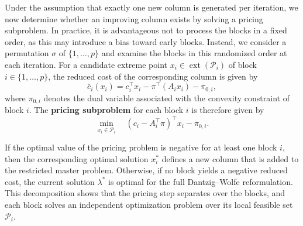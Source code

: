 \documentclass{book}
\theoremstyle{definition}
\numberwithin{algorithm_}{chapter}
\begin{document}
\bigskip

Under the assumption that exactly one new column is generated per iteration, we now determine whether an improving column exists by solving a pricing subproblem. In practice, it is advantageous not to process the blocks in a fixed order, as this may introduce a bias toward early blocks. Instead, we consider a permutation $\sigma$ of $\{1,\dots,p\}$ and examine the blocks in this randomized order at each iteration. For a candidate extreme point $x_i \in \operatorname{ext}(\mathcal{P}_i)$ of block $i \in \{1,\dots,p\}$, the reduced cost of the corresponding column is given by
\begin{equation}
\bar{c}_i(x_i) = c_i^\top x_i - \pi^\top (A_i x_i) - \pi_{0,i},
\end{equation}
where $\pi_{0,i}$ denotes the dual variable associated with the convexity constraint of block $i$.
The \textbf{pricing subproblem} for each block $i$ is therefore given by
\begin{equation}\label{eq:pricing-multiblock}
\min_{x_i \in \mathcal{P}_i} \quad
(c_i - A_i^\top \pi)^\top x_i - \pi_{0,i}.
\end{equation}

If the optimal value of the pricing problem is negative for at least one block $i$, then the corresponding optimal solution $x_i^*$ defines a new column that is added to the restricted master problem. Otherwise, if no block yields a negative reduced cost, the current solution $\lambda^*$ is optimal for the full Dantzig--Wolfe reformulation. This decomposition shows that the pricing step separates over the blocks, and each block solves an independent optimization problem over its local feasible set $\mathcal{P}_i$.

\bigskip
\end{document}

